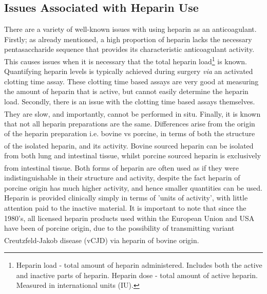 \subsection{Issues Associated with Heparin Use}
There are a variety of well-known issues with using heparin as an anticoagulant.
Firstly; as already mentioned, a high proportion of heparin lacks the necessary pentasaccharide sequence that provides its characteristic anticoagulant activity. This causes issues when it is necessary that the total heparin load\footnote{Heparin load - total amount of heparin administered. Includes both the active and inactive parts of heparin.
\newline
Heparin dose - total amount of active heparin. Measured in international units (IU).} is known.   Quantifying heparin levels is typically achieved during surgery \textit{via} an activated clotting time assay. These clotting time based assays are very good at measuring the amount of heparin that is active, but cannot easily determine the heparin load. 
\newline
Secondly, there is an issue with the clotting time based assays themselves. They are slow, and importantly, cannot be performed in situ.\textsuperscript{\cite{Bromfield2013HeparinApplications}} 
\newline
Finally, it is known that not all heparin preparations are the same. Differences arise from the origin of the heparin preparation i.e. bovine vs porcine, in terms of both the structure of the isolated heparin, and its activity.\textsuperscript{\cite{Mulloy2015PharmacologyDrugs}} Bovine sourced heparin can be isolated from both lung and intestinal tissue, whilst porcine sourced heparin is exclusively from intestinal tissue.\textsuperscript{\cite{Tovar2013BovineHaemodialysis.}} Both forms of heparin are often used as if they were indistinguishable in their structure and activity, despite the fact heparin of porcine origin has much higher activity, and hence smaller quantities can be used.  Heparin is provided clinically simply in terms of 'units of activity', with little attention paid to the inactive material. 
\newline
It is important to note that since the 1980's, all licensed heparin products used within the European Union and USA have been of porcine origin, due to the possibility of transmitting variant Creutzfeld-Jakob disease (vCJD) via heparin of bovine origin.\textsuperscript{\cite{Mulloy2015PharmacologyDrugs}}  

